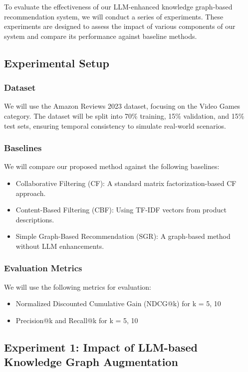 \documentclass{article}
\begin{document}
To evaluate the effectiveness of our LLM-enhanced knowledge graph-based recommendation system, we will conduct a series of experiments. These experiments are designed to assess the impact of various components of our system and compare its performance against baseline methods.

\subsection{Experimental Setup}

\subsubsection{Dataset}
We will use the Amazon Reviews 2023 dataset, focusing on the Video Games category. The dataset will be split into 70\% training, 15\% validation, and 15\% test sets, ensuring temporal consistency to simulate real-world scenarios.

\subsubsection{Baselines}
We will compare our proposed method against the following baselines:
\begin{itemize}
    \item Collaborative Filtering (CF): A standard matrix factorization-based CF approach.
    \item Content-Based Filtering (CBF): Using TF-IDF vectors from product descriptions.
    \item Simple Graph-Based Recommendation (SGR): A graph-based method without LLM enhancements.
\end{itemize}

\subsubsection{Evaluation Metrics}
We will use the following metrics for evaluation:
\begin{itemize}
    \item Normalized Discounted Cumulative Gain (NDCG@k) for k = 5, 10
    \item Precision@k and Recall@k for k = 5, 10
\end{itemize}

\subsection{Experiment 1: Impact of LLM-based Knowledge Graph Augmentation}
\end{document}
